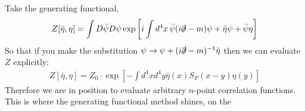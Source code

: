 \documentclass{report}
\theoremstyle{plain}
\theoremstyle{definition}
\theoremstyle{remark}
\newcommand{\FR}[2]{\frac{#1}{#2}}
\newcommand{\di}{\partial}
\newcommand{\sdi}{\slashed\partial}
\begin{document}
\begin{comment}
%
\end{comment}
Take the generating functional,
\begin{align*}
Z[\bar\eta,\eta] = \int D\bar\psi D\psi 
\exp\left[ i\int d^4x\,\bar\psi(i\sdi-m)\psi + \bar\eta\psi+\bar\psi\eta
\right]
\end{align*}
So that if you make the substitution $\psi \to \psi+(i\sdi-m)^{-1}\bar\eta$
then we can evaluate $Z$ explicitly:
\begin{align*}
Z[\bar\eta,\eta] =  Z_0\cdot \exp\left[ -\int d^4xd^4y
\bar\eta(x)S_F(x-y)\eta(y) \right]
\end{align*}
Therefore we are in position to evaluate arbitrary $n$-point correlation
functions. This is where the generating functional method shines, on the
\end{document}
